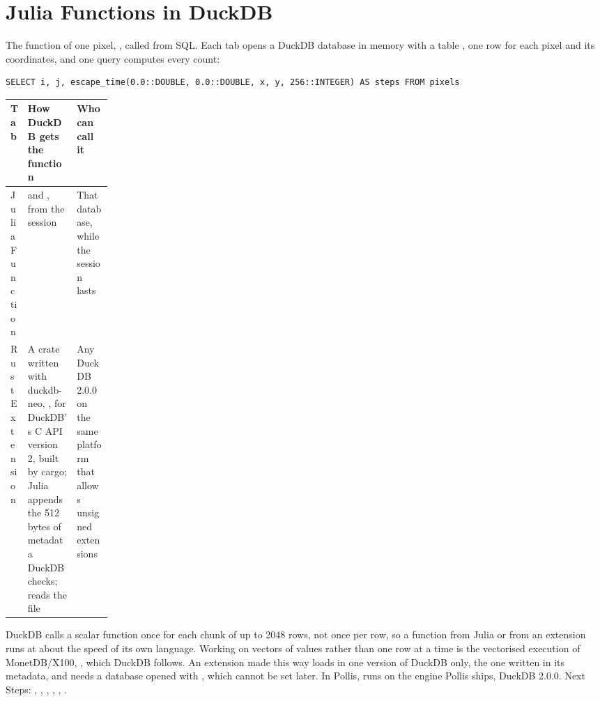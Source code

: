 \section{Julia Functions in DuckDB}\label{sec:duckdb}
The function of one pixel, , called from SQL. Each tab opens a DuckDB
database in memory with a table , one row for each pixel and its coordinates, and one query computes
every count:
\begin{lstlisting}
SELECT i, j, escape_time(0.0::DOUBLE, 0.0::DOUBLE, x, y, 256::INTEGER) AS steps FROM pixels
\end{lstlisting}
\begin{center}\small
\renewcommand{\arraystretch}{1.25}
\begin{tabularx}{\linewidth}{@{}p{0.17\linewidth}LL@{}}
\toprule
\textbf{Tab} & \textbf{How DuckDB gets the function} & \textbf{Who can call it}\\
\midrule
Julia Function &  and , from the session &
  That database, while the session lasts\\
Rust Extension & A crate written with duckdb-neo,
  , for DuckDB's C API version 2, built by cargo; Julia appends the 512
  bytes of metadata DuckDB checks;  reads the file & Any DuckDB 2.0.0 on the same platform that allows
  unsigned extensions\\
\bottomrule
\end{tabularx}
\end{center}
DuckDB calls a scalar function once for each chunk of up to 2048 rows, not once per row, so a function from Julia or
from an extension runs at about the speed of its own language. Working on vectors of values rather than one row at a
time is the vectorised execution of MonetDB/X100, , which DuckDB
follows. An extension made this way loads in one version of
DuckDB only, the one written in its metadata, and needs a database opened with ,
which cannot be set later. In Pollis,  runs on the engine Pollis ships, DuckDB 2.0.0. Next Steps:
, , , , , .

